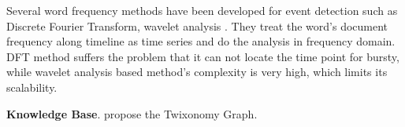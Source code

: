 \documentclass[conference,compsoc]{IEEEtran}
\begin{document}
Several word frequency methods have been developed for event detection such as Discrete Fourier Transform\cite{he2007analyzingDFT}, wavelet analysis \cite{weng2011eventWavelet}.
They treat the word's document frequency along timeline as time series and do the analysis in frequency domain. 
DFT method suffers the problem that it can not locate the time point for bursty, while wavelet analysis based method's complexity is very high, which limits its scalability. 

\textbf{Knowledge Base}. \cite{faralli2015large} propose the Twixonomy Graph. 


\end{document}
